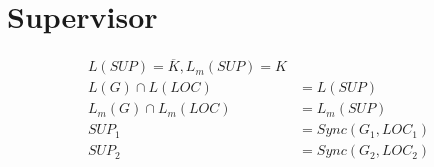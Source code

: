 \chapter{Supervisor}

\begin{align}
    L(SUP) = \overline{K}, L_m(SUP)=K\\
	L(G)\cap L(LOC) &= L(SUP)\\
	L_m(G)\cap L_m(LOC) &= L_m(SUP)\\
	SUP_1&=Sync(G_1,LOC_1) \\
	SUP_2&=Sync(G_2,LOC_2)\\
\end{align}

